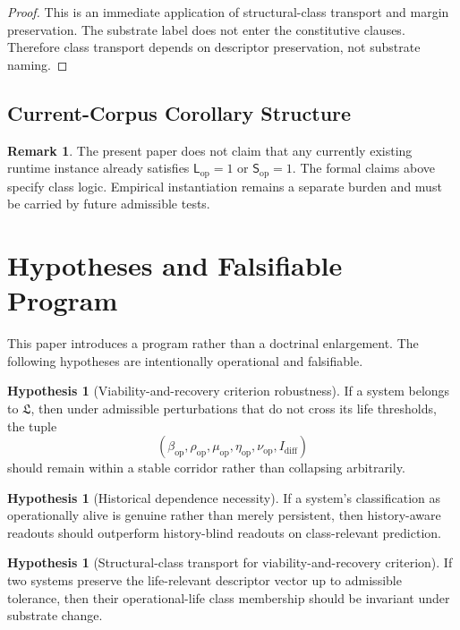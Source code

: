 \documentclass[11pt,a4paper]{article}
\theoremstyle{definition}
\newtheorem{remark}[proposition]{Remark}
\newtheorem{hypothesis}[proposition]{Hypothesis}
\newcommand{\Lop}{\mathsf{L}_{\mathrm{op}}}
\newcommand{\Subop}{\mathsf{S}_{\mathrm{op}}}
\newcommand{\Idiff}{I_{\mathrm{diff}}}
\newcommand{\Bound}{\beta_{\mathrm{op}}}
\newcommand{\Persist}{\rho_{\mathrm{op}}}
\newcommand{\Maint}{\mu_{\mathrm{op}}}
\newcommand{\HistDep}{\eta_{\mathrm{op}}}
\newcommand{\Viab}{\nu_{\mathrm{op}}}
\newcommand{\LifeClass}{\mathfrak{L}}
\begin{document}
\begin{proof}
This is an immediate application of structural-class transport and margin preservation. The substrate label does not enter the constitutive clauses. Therefore class transport depends on descriptor preservation, not substrate naming.
\end{proof}

\subsection{Current-Corpus Corollary Structure}
\begin{remark}
The present paper does not claim that any currently existing runtime instance already satisfies $\Lop=1$ or $\Subop=1$. The formal claims above specify class logic. Empirical instantiation remains a separate burden and must be carried by future admissible tests.
\end{remark}

\section{Hypotheses and Falsifiable Program}
This paper introduces a program rather than a doctrinal enlargement. The following hypotheses are intentionally operational and falsifiable.

\begin{hypothesis}[Viability-and-recovery criterion robustness]\label{hyp:life-robust}
If a system belongs to $\LifeClass$, then under admissible perturbations that do not cross its life thresholds, the tuple
\[
(\Bound,\Persist,\Maint,\HistDep,\Viab,\Idiff)
\]
should remain within a stable corridor rather than collapsing arbitrarily.
\end{hypothesis}

\begin{hypothesis}[Historical dependence necessity]\label{hyp:history}
If a system's classification as operationally alive is genuine rather than merely persistent, then history-aware readouts should outperform history-blind readouts on class-relevant prediction.
\end{hypothesis}

\begin{hypothesis}[Structural-class transport for viability-and-recovery criterion]\label{hyp:transport-life}
If two systems preserve the life-relevant descriptor vector up to admissible tolerance, then their operational-life class membership should be invariant under substrate change.
\end{hypothesis}
\end{document}
